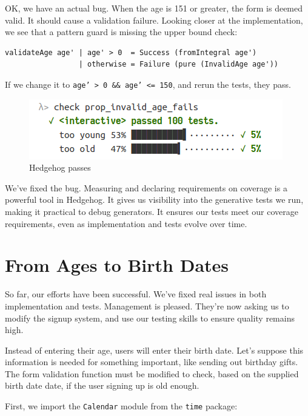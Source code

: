 \noindent OK, we have an actual bug. When the age is 151 or greater, the form is
deemed valid. It should cause a validation failure. Looking closer at
the implementation, we see that a pattern guard is missing the upper
bound check:

\begin{verbatim}
validateAge age' | age' > 0  = Success (fromIntegral age')
                 | otherwise = Failure (pure (InvalidAge age'))
\end{verbatim}
If we change it to
\texttt{age' > 0 && age' <= 150},
and rerun the tests, they pass.

\begin{figure}[htbp]
 \centering
 \includegraphics[width=.95\linewidth]{./pics/hedgehog3.png}
 \caption{Hedgehog passes}
 \label{fig:hedgehog3}
\end{figure}

\noindent We've fixed the bug.
Measuring and declaring requirements on coverage is a powerful tool in
Hedgehog. It gives us visibility into the generative tests we run,
making it practical to debug generators. It ensures our tests meet our
coverage requirements, even as implementation and tests evolve over
time.

\section{From Ages to Birth Dates}
\label{from-ages-to-birth-dates}

So far, our efforts have been successful. We've fixed real issues in
both implementation and tests. Management is pleased. They're now asking
us to modify the signup system, and use our testing skills to ensure
quality remains high.

Instead of entering their age, users will enter their birth date. Let's
suppose this information is needed for something important, like sending
out birthday gifts. The form validation function must be modified to
check, based on the supplied birth date date, if the user signing up is
old enough.

First, we import the \texttt{Calendar} module from the \texttt{time}
package:

